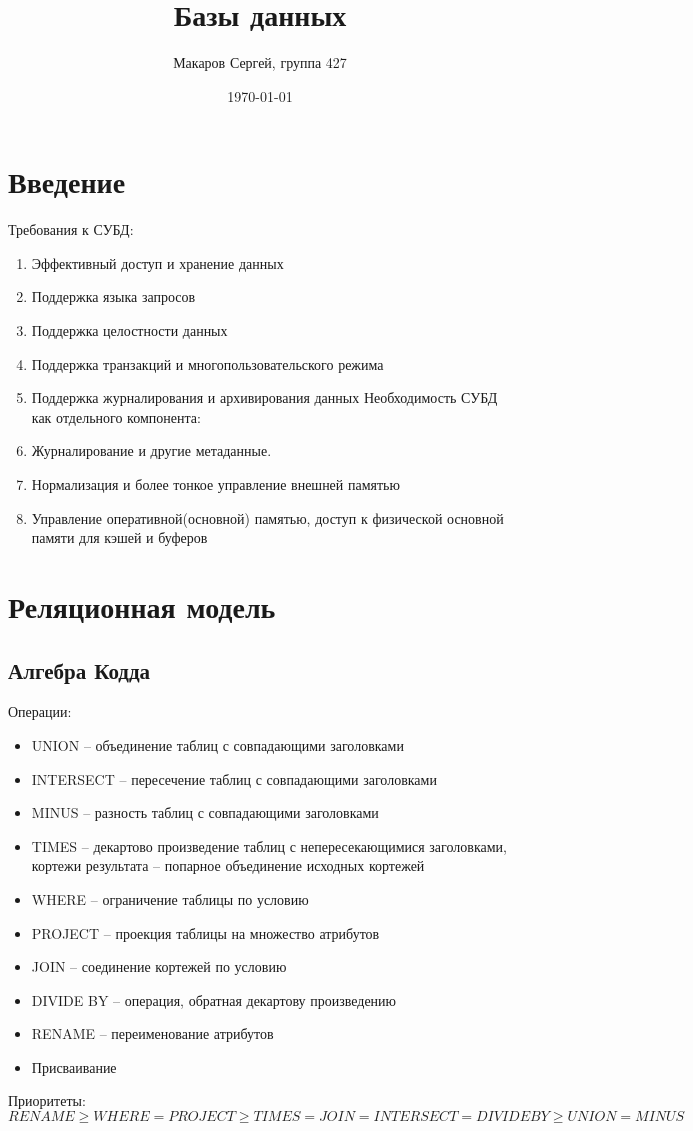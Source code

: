 \documentclass[11pt]{article}
\author{Макаров Сергей, группа 427}
\date{\today}
\title{Базы данных}
\begin{document}
\maketitle

\section{Введение}
\label{sec:org1a56f17}
Требования к СУБД:
\begin{enumerate}
\item Эффективный доступ и хранение данных
\item Поддержка языка запросов
\item Поддержка целостности данных
\item Поддержка транзакций и многопользовательского режима
\item Поддержка журналирования и архивирования данных
Необходимость СУБД как отдельного компонента:
\item Журналирование и другие метаданные.
\item Нормализация и более тонкое управление внешней памятью
\item Управление оперативной(основной) памятью, доступ к физической основной памяти для кэшей и буферов
\end{enumerate}
\section{Реляционная модель}
\label{sec:orgb86b8b9}
\subsection{Алгебра Кодда}
\label{sec:orgbe72c8d}
Операции:
\begin{itemize}
\item UNION -- объединение таблиц с совпадающими заголовками
\item INTERSECT -- пересечение таблиц с совпадающими заголовками
\item MINUS -- разность таблиц с совпадающими заголовками
\item TIMES -- декартово произведение таблиц с непересекающимися заголовками, кортежи результата -- попарное объединение исходных кортежей
\item WHERE -- ограничение таблицы по условию
\item PROJECT -- проекция таблицы на множество атрибутов
\item JOIN -- соединение кортежей по условию
\item DIVIDE BY -- операция, обратная декартову произведению
\item RENAME -- переименование атрибутов
\item Присваивание
\end{itemize}
Приоритеты:
\begin{equation*}
RENAME \geq WHERE = PROJECT \geq TIMES = JOIN = INTERSECT = DIVIDE BY \geq UNION = MINUS
\end{equation*}
\end{document}
